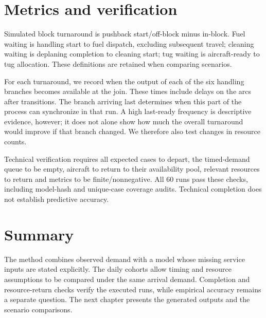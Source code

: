 \section{Metrics and verification}
Simulated block turnaround is pushback start/off-block minus in-block. Fuel waiting is handling start to fuel dispatch, excluding subsequent travel; cleaning waiting is deplaning completion to cleaning start; tug waiting is aircraft-ready to tug allocation. These definitions are retained when comparing scenarios.

For each turnaround, we record when the output of each of the six handling branches becomes available at the join. These times include delays on the arcs after transitions. The branch arriving last determines when this part of the process can synchronize in that run. A high last-ready frequency is descriptive evidence, however; it does not alone show how much the overall turnaround would improve if that branch changed. We therefore also test changes in resource counts.

Technical verification requires all expected cases to depart, the timed-demand queue to be empty, aircraft to return to their availability pool, relevant resources to return and metrics to be finite/nonnegative. All 60 runs pass these checks, including model-hash and unique-case coverage audits. Technical completion does not establish predictive accuracy.


\section{Summary}
The method combines observed demand with a model whose missing service inputs are stated explicitly. The daily cohorts allow timing and resource assumptions to be compared under the same arrival demand. Completion and resource-return checks verify the executed runs, while empirical accuracy remains a separate question. The next chapter presents the generated outputs and the scenario comparisons.
